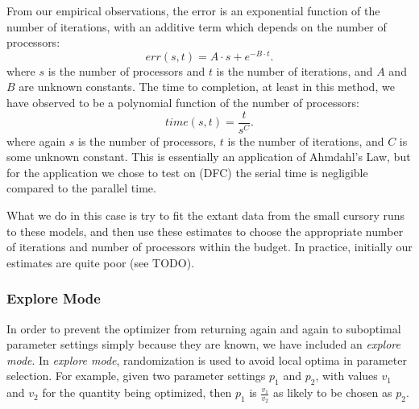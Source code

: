 From our empirical observations, the error is an exponential function of
the number of iterations, with an additive term which depends on the number
of processors:
\[
err(s,t) = A\cdot s + e^{-B\cdot t}.
\]
where $s$ is the number of processors and $t$ is the number of iterations, 
and $A$ and $B$ are unknown constants. The time to completion, at least 
in this method, we have observed to be a polynomial function of the 
number of processors:
\[
time(s,t) = \frac{t}{s^{C}}.
\]
where again $s$ is the number of processors, $t$ is the number of iterations, and $C$ is some unknown constant. This is essentially an application of 
Ahmdahl's Law, but for the application we chose to test on (DFC) the
serial time is negligible compared to the parallel time.

What we do in this case is try to fit the extant data from the small
cursory runs to these models, and then use these estimates to choose
the appropriate number of iterations and number of processors within the
budget. In practice, initially our estimates are quite poor (see TODO).

\subsubsection{Explore Mode}
\label{sec:explore}
In order to prevent the optimizer from returning again and again to
suboptimal parameter settings simply because they are known, we have 
included an {\em explore mode}. In {\em explore mode}, randomization is
used to avoid local optima in parameter selection. For example, given two
parameter settings $p_1$ and $p_2$, with values $v_1$  and $v_2$ for the
quantity being optimized, then $p_1$ is $\frac{v_1}{v_2}$ as likely to
be chosen as $p_2$. 



